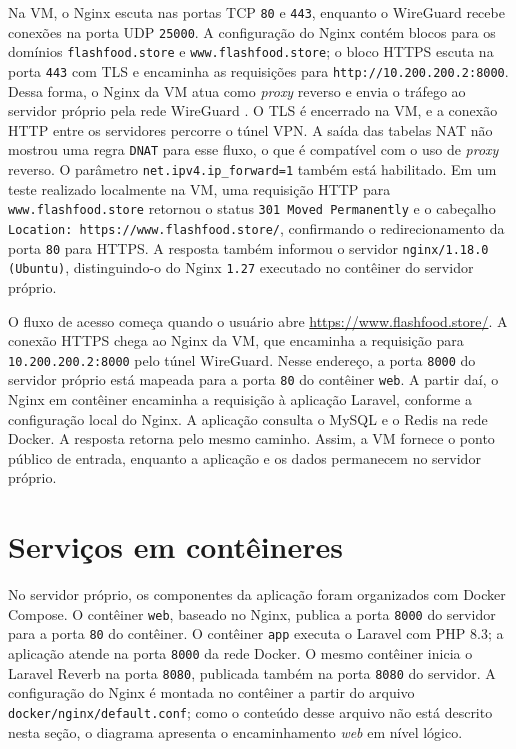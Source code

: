 Na VM, o Nginx escuta nas portas TCP \texttt{80} e \texttt{443}, enquanto o WireGuard recebe conexões na porta UDP \texttt{25000}. A configuração do Nginx contém blocos para os domínios \texttt{flashfood.store} e \texttt{www.flashfood.store}; o bloco HTTPS escuta na porta \texttt{443} com TLS e encaminha as requisições para \texttt{http://10.200.200.2:8000}. Dessa forma, o Nginx da VM atua como \textit{proxy} reverso e envia o tráfego ao servidor próprio pela rede WireGuard \cite{nginxBeginnersGuide}. O TLS é encerrado na VM, e a conexão HTTP entre os servidores percorre o túnel VPN. A saída das tabelas NAT não mostrou uma regra \texttt{DNAT} para esse fluxo, o que é compatível com o uso de \textit{proxy} reverso. O parâmetro \texttt{net.ipv4.ip\_forward=1} também está habilitado. Em um teste realizado localmente na VM, uma requisição HTTP para \texttt{www.flashfood.store} retornou o status \texttt{301 Moved Permanently} e o cabeçalho \texttt{Location: https://www.flashfood.store/}, confirmando o redirecionamento da porta \texttt{80} para HTTPS. A resposta também informou o servidor \texttt{nginx/1.18.0 (Ubuntu)}, distinguindo-o do Nginx \texttt{1.27} executado no contêiner do servidor próprio.

O fluxo de acesso começa quando o usuário abre \url{https://www.flashfood.store/}. A conexão HTTPS chega ao Nginx da VM, que encaminha a requisição para \texttt{10.200.200.2:8000} pelo túnel WireGuard. Nesse endereço, a porta \texttt{8000} do servidor próprio está mapeada para a porta \texttt{80} do contêiner \texttt{web}. A partir daí, o Nginx em contêiner encaminha a requisição à aplicação Laravel, conforme a configuração local do Nginx. A aplicação consulta o MySQL e o Redis na rede Docker. A resposta retorna pelo mesmo caminho. Assim, a VM fornece o ponto público de entrada, enquanto a aplicação e os dados permanecem no servidor próprio.

\section{Serviços em contêineres}

No servidor próprio, os componentes da aplicação foram organizados com Docker Compose. O contêiner \texttt{web}, baseado no Nginx, publica a porta \texttt{8000} do servidor para a porta \texttt{80} do contêiner. O contêiner \texttt{app} executa o Laravel com PHP 8.3; a aplicação atende na porta \texttt{8000} da rede Docker. O mesmo contêiner inicia o Laravel Reverb na porta \texttt{8080}, publicada também na porta \texttt{8080} do servidor. A configuração do Nginx é montada no contêiner a partir do arquivo \texttt{docker/nginx/default.conf}; como o conteúdo desse arquivo não está descrito nesta seção, o diagrama apresenta o encaminhamento \textit{web} em nível lógico.

